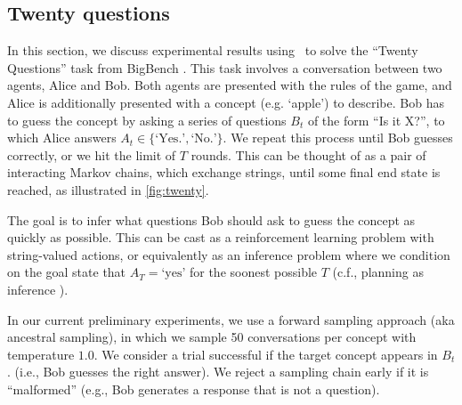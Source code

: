 \subsection{Twenty questions}
\label{sec:twenty}

In this section, we discuss experimental results using \cascades\ to solve the
 ``Twenty Questions'' task from BigBench \citep{bigbench}.
This task  involves a conversation between two agents, Alice and Bob.
Both agents are presented with the rules of the game, and Alice is additionally presented with a concept (e.g. `apple') to describe.
Bob has to guess the concept by asking a series of  questions
$B_t$ of the form ``Is it X?'', to which Alice answers
$A_t \in \{ \text{`Yes.'}, \text{`No.'}\}$.
We repeat this process until Bob guesses correctly, or we hit the limit of $T$ rounds.
This can be thought of as a pair of interacting Markov chains, which exchange strings, until some final end state is reached,
 as illustrated in \cref{fig:twenty}.





The goal is to infer what questions Bob should ask to guess the concept as quickly as possible. This can be cast as a reinforcement learning problem with string-valued actions, or equivalently as an inference problem where we condition on the goal state that $A_T=\text{`yes'}$ for the soonest possible $T$ (c.f., planning as inference \cite{rl_inference}). %

In our current preliminary experiments, we use a forward sampling
approach (aka ancestral sampling), in which 
we sample 50 conversations per concept with temperature $1.0$.
We consider a trial successful if the target concept appears in $B_t$.
(i.e., Bob guesses the right answer).
We reject a sampling chain early if it is ``malformed''
(e.g., Bob generates a response that is not a question).

